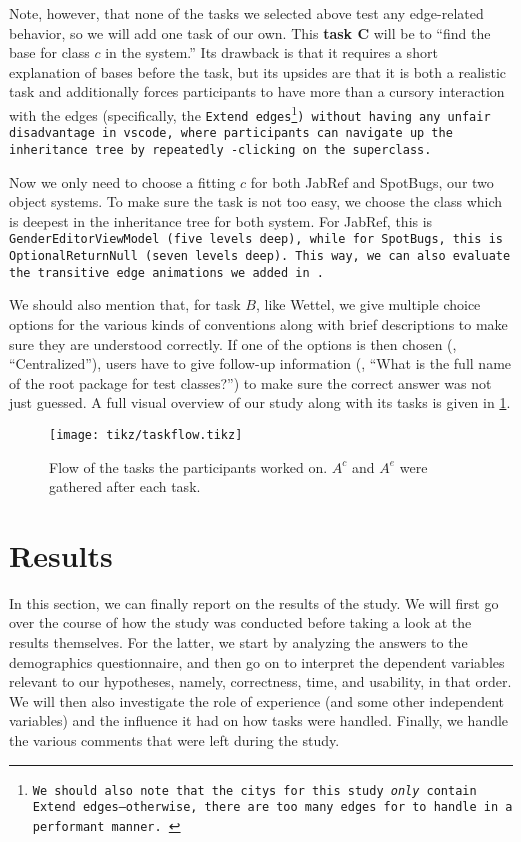 \documentclass[../thesis]{subfiles}
\begin{document}
Note, however, that none of the tasks we selected above test any edge-related behavior, so we will add one task of our own.
This \textbf{task $\bm{C}$} will be to \enquote{find the \gls{base} for class $c$ in the system.}
Its drawback is that it requires a short explanation of \glspl{base} before the task, but its upsides are that it is both a realistic task and additionally forces participants to have more than a cursory interaction with the edges (specifically, the \tt{Extend} edges\footnote{
	We should also note that the \glspl{city} for this study \emph{only} contain \tt{Extend} edges---otherwise, there are too many edges for \SEE{} to handle in a performant manner.
}) without having any unfair disadvantage in \gls{vscode}, where participants can navigate up the inheritance tree by repeatedly -clicking on the superclass.

Now we only need to choose a fitting $c$ for both JabRef and SpotBugs, our two object systems.
To make sure the task is not too easy, we choose the class which is deepest in the inheritance tree for both system.
For JabRef, this is \tt{GenderEditorViewModel} (five levels deep), while for SpotBugs, this is \tt{OptionalReturnNull} (seven levels deep).
This way, we can also evaluate the transitive edge animations we added in .

We should also mention that, for task $B$, like Wettel, we give multiple choice options for the various kinds of conventions along with brief descriptions to make sure they are understood correctly.
If one of the options is then chosen (\eg, \enquote{Centralized}), users have to give follow-up information (\eg, \enquote{What is the full name of the root package for test classes?}) to make sure the correct answer was not just guessed.
A full visual overview of our study along with its tasks is given in \cref{fig:taskflow}.

\begin{figure}
	\centering
	\texttt{[image: tikz/taskflow.tikz]}
	\caption{Flow of the tasks the participants worked on.
		$A^c$ and $A^e$ were gathered after each task.
	}\label{fig:taskflow}
\end{figure}


\section{Results}\label{sec:results}
In this section, we can finally report on the results of the study.
We will first go over the course of how the study was conducted before taking a look at the results themselves.
For the latter, we start by analyzing the answers to the demographics questionnaire, and then go on to interpret the dependent variables relevant to our hypotheses, namely, correctness, time, and usability, in that order.
We will then also investigate the role of experience (and some other independent variables) and the influence it had on how tasks were handled.
Finally, we handle the various comments that were left during the study.
\end{document}

